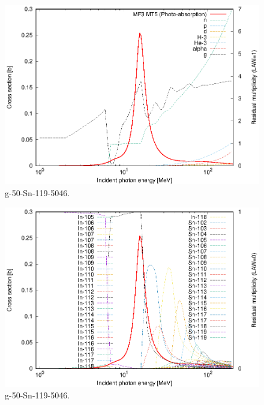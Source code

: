 \begin{figure}
 \includegraphics[width=\linewidth]{eps/g_50-Sn-119_5046.eps}
  \caption{g-50-Sn-119-5046.}
\end{figure}
\begin{figure}
 \includegraphics[width=\linewidth]{eps-law0/g_50-Sn-119_5046.eps}
 \caption{g-50-Sn-119-5046.}
\end{figure}
\newpage \clearpage

